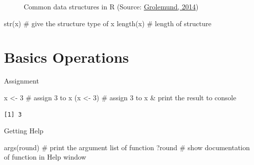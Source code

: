 \documentclass[
  letterpaper,
  DIV=11,
  numbers=noendperiod]{scrreprt}
\newenvironment{Shaded}{\begin{snugshade}}{\end{snugshade}}
\newcommand{\CommentTok}[1]{\textcolor[rgb]{0.37,0.37,0.37}{#1}}
\newcommand{\DecValTok}[1]{\textcolor[rgb]{0.68,0.00,0.00}{#1}}
\newcommand{\FunctionTok}[1]{\textcolor[rgb]{0.28,0.35,0.67}{#1}}
\newcommand{\NormalTok}[1]{\textcolor[rgb]{0.00,0.23,0.31}{#1}}
\newcommand{\OtherTok}[1]{\textcolor[rgb]{0.00,0.23,0.31}{#1}}
\begin{document}
\begin{figure}


\caption{\label{fig-datastructure}Common data structures in R (Source:
\href{https://jjallaire.github.io/hopr/objects.html}{Grolemund, 2014})}

\end{figure}%

\begin{Shaded}
\begin{Highlighting}[]
\FunctionTok{str}\NormalTok{(x)      }\CommentTok{\# give the structure type of x}
\FunctionTok{length}\NormalTok{(x)   }\CommentTok{\# length of structure}
\end{Highlighting}
\end{Shaded}

\section{Basics Operations}\label{basics-operations}

Assignment

\begin{Shaded}
\begin{Highlighting}[]
\NormalTok{x }\OtherTok{\textless{}{-}} \DecValTok{3}      \CommentTok{\# assign 3 to x}
\NormalTok{(x }\OtherTok{\textless{}{-}} \DecValTok{3}\NormalTok{)    }\CommentTok{\# assign 3 to x \& print the result to console}
\end{Highlighting}
\end{Shaded}

\begin{verbatim}
[1] 3
\end{verbatim}

Getting Help

\begin{Shaded}
\begin{Highlighting}[]
\FunctionTok{args}\NormalTok{(round) }\CommentTok{\# print the argument list of function}
\NormalTok{?round        }\CommentTok{\# show documentation of function in Help window}
\end{Highlighting}
\end{Shaded}
\end{document}
